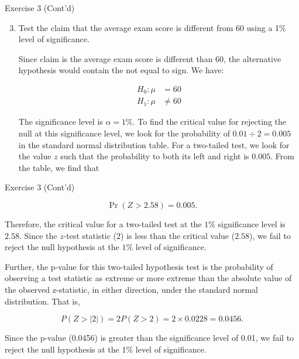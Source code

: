 \documentclass[
  ignorenonframetext,
  aspectratio=43,
]{beamer}
\let\olditem\item
\renewcommand\item{\olditem\justifying}
\begin{document}
\begin{frame}{Exercise 3 (Cont'd)}
\protect\hypertarget{exercise-3-contd-5}{}
\begin{enumerate}
\setcounter{enumi}{2}
\item
  Test the claim that the average exam score is different from 60 using
  a 1\% level of significance.

  \pause

  Since claim is the average exam score is different than 60, the
  alternative hypothesis would contain the not equal to sign. We have:
  \vspace{-5pt}

  \pause

  \[
   \begin{aligned}
   H_0:\mu &=60 \\ 
   H_1:\mu &\neq 60
   \end{aligned}
   \]

  \pause

  The significance level is \(\alpha=1\%\). To find the critical value
  for rejecting the null at this significance level, we look for the
  probability of \(0.01 \div 2 = 0.005\) in the standard normal
  distribution table. For a two-tailed test, we look for the value \(z\)
  such that the probability to both its left and right is \(0.005\).
  From the table, we find that
\end{enumerate}
\end{frame}

\begin{frame}{Exercise 3 (Cont'd)}
\protect\hypertarget{exercise-3-contd-6}{}
\pause

\[
\Pr(Z>2.58)=0.005.
\] \vspace{-15pt}

\pause

Therefore, the critical value for a two-tailed test at the \(1\%\)
significance level is \(2.58\). Since the \(z\)-test statistic (2) is
less than the critical value (\(2.58\)), we fail to reject the null
hypothesis at the \(1\%\) level of significance.

\pause

Further, the p-value for this two-tailed hypothesis test is the
probability of observing a test statistic as extreme or more extreme
than the absolute value of the observed z-statistic, in either
direction, under the standard normal distribution. That is,
\vspace{-5pt}

\pause

\[
P(Z > |2|) = 2P(Z > 2) = 2 \times 0.0228 = 0.0456.
\]

\pause

Since the p-value (0.0456) is greater than the significance level of
0.01, we fail to reject the null hypothesis at the 1\% level of
significance.
\end{frame}
\end{document}
